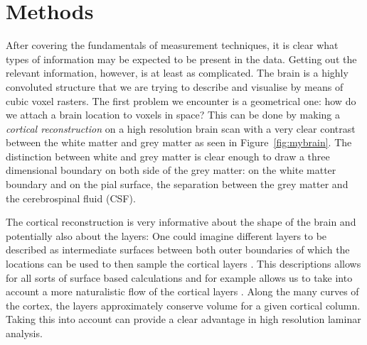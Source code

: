 \section*{Methods}
After covering the fundamentals of measurement techniques, it is clear what types of information may be expected to be present in the data. Getting out the relevant information, however, is at least as complicated. The brain is a highly convoluted structure that we are trying to describe and visualise by means of cubic voxel rasters. The first problem we encounter is a geometrical one: how do we attach a brain location to voxels in space? This can be done by making a \emph{cortical reconstruction} on a high resolution brain scan \cite{Dale1999,Bazin2012} with a very clear contrast between the white matter and grey matter as seen in Figure~\ref{fig:mybrain}. The distinction between white and grey matter is clear enough to draw a three dimensional boundary on both side of the grey matter: on the white matter boundary and on the pial surface, the separation between the grey matter and the cerebrospinal fluid (CSF).


The cortical reconstruction is very informative about the shape of the brain and potentially also about the layers: One could imagine different layers to be described as intermediate surfaces between both outer boundaries of which the locations can be used to then sample the cortical layers \cite{Koopmans2011,Polimeni2010,DeMartino2013}. This descriptions allows for all sorts of surface based calculations \cite{Fischl2000,Bazin2012} and for example allows us to take into account a more naturalistic flow of the cortical layers \cite{Bok1929,Waehnert2014}. Along the many curves of the cortex, the layers approximately conserve volume for a given cortical column. Taking this into account can provide a clear advantage in high resolution laminar analysis.

